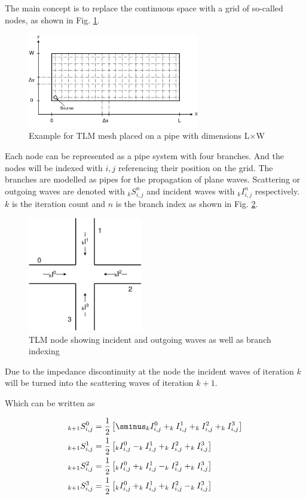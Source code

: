 \documentclass[twocolumn]{article}
\begin{document}
The main concept is to replace the continuous space with a grid of so-called nodes,
as shown in Fig. \ref{fig_tlm_mesh}.

\begin{figure}[H]
    \centering
    \includegraphics[width=75mm]{./Images/tlm_pipe.png}
    \caption{Example for TLM mesh placed on a pipe with dimensions L$\times$W}
    \label{fig_tlm_mesh}
\end{figure}

Each node can be represented as a pipe system with four branches.
And the nodes will be indexed with $i, j$ referencing their position on the grid.
The branches are modelled as pipes for the propagation of plane waves.
Scattering or outgoing waves are denoted with $_{k}S_{i,j}^{n}$ and incident waves
with $_{k}I_{i,j}^{n}$ respectively.
$k$ is the iteration count and $n$ is the branch index as shown in Fig.
\ref{fig_tlm_node}.

\begin{figure}[H]
    \centering
    \includegraphics[width=50mm]{./Images/tlm_node_incoming.png}
    \caption{TLM node showing incident and outgoing waves as well as branch indexing}
    \label{fig_tlm_node}
\end{figure}

Due to the impedance discontinuity at the node the incident waves of iteration $k$
will be turned into the scattering waves of iteration $k+1$.

Which can be written as

\begin{equation}
\begin{aligned}
    _{k+1}S_{i,j}^{0} &= \frac{1}{2}\left[\sminus_kI_{i,j}^{0}+_kI_{i,j}^{1}+_kI_{i,j}^{2}+_kI_{i,j}^{3}\right] \\
    _{k+1}S_{i,j}^{1} &= \frac{1}{2}\left[_kI_{i,j}^{0}-_kI_{i,j}^{1}+_kI_{i,j}^{2}+_kI_{i,j}^{3}\right] \\
    _{k+1}S_{i,j}^{2} &= \frac{1}{2}\left[_kI_{i,j}^{0}+_kI_{i,j}^{1}-_kI_{i,j}^{2}+_kI_{i,j}^{3}\right] \\
    _{k+1}S_{i,j}^{3} &= \frac{1}{2}\left[_kI_{i,j}^{0}+_kI_{i,j}^{1}+_kI_{i,j}^{2}-_kI_{i,j}^{3}\right] \\
\end{aligned}
\end{equation}
\end{document}
